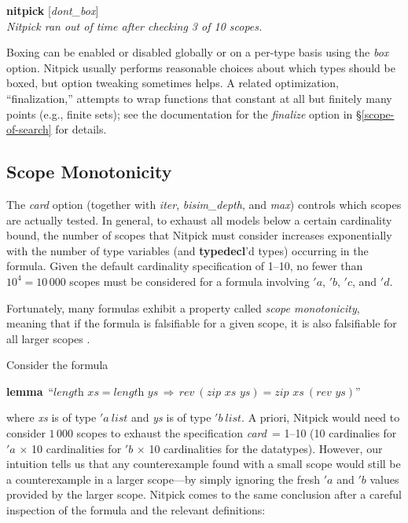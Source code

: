\documentclass[a4paper,12pt]{article}
\begin{document}
\prew
\textbf{nitpick} [\textit{dont\_box}] \\[2\smallskipamount]
{\slshape Nitpick ran out of time after checking 3 of 10 scopes.}
\postw

{
Boxing can be enabled or disabled globally or on a per-type basis using the
\textit{box} option. Nitpick usually performs reasonable choices about which
types should be boxed, but option tweaking sometimes helps. A related optimization,
``finalization,'' attempts to wrap functions that constant at all but finitely
many points (e.g., finite sets); see the documentation for the \textit{finalize}
option in \S\ref{scope-of-search} for details.

}

\subsection{Scope Monotonicity}
\label{scope-monotonicity}

The \textit{card} option (together with \textit{iter}, \textit{bisim\_depth},
and \textit{max}) controls which scopes are actually tested. In general, to
exhaust all models below a certain cardinality bound, the number of scopes that
Nitpick must consider increases exponentially with the number of type variables
(and \textbf{typedecl}'d types) occurring in the formula. Given the default
cardinality specification of 1--10, no fewer than $10^4 = 10\,000$ scopes must be
considered for a formula involving $'a$, $'b$, $'c$, and $'d$.

Fortunately, many formulas exhibit a property called \textsl{scope
monotonicity}, meaning that if the formula is falsifiable for a given scope,
it is also falsifiable for all larger scopes \cite[p.~165]{jackson-2006}.

Consider the formula

\prew
\textbf{lemma}~``$\textit{length~xs} = \textit{length~ys} \,\Longrightarrow\, \textit{rev}~(\textit{zip~xs~ys}) = \textit{zip~xs}~(\textit{rev~ys})$''
\postw

where \textit{xs} is of type $'a~\textit{list}$ and \textit{ys} is of type
$'b~\textit{list}$. A priori, Nitpick would need to consider $1\,000$ scopes to
exhaust the specification \textit{card}~= 1--10 (10 cardinalies for $'a$
$\times$ 10 cardinalities for $'b$ $\times$ 10 cardinalities for the datatypes).
However, our intuition tells us that any counterexample found with a small scope
would still be a counterexample in a larger scope---by simply ignoring the fresh
$'a$ and $'b$ values provided by the larger scope. Nitpick comes to the same
conclusion after a careful inspection of the formula and the relevant
definitions:
\end{document}

